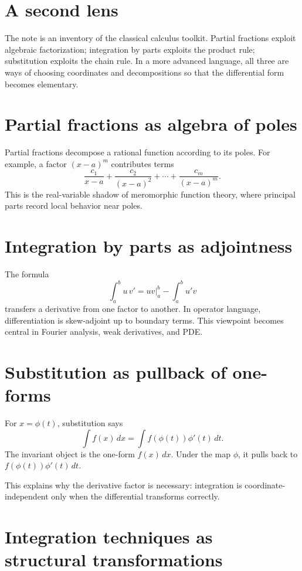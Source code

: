 \section{A second lens}

The note is an inventory of the classical calculus toolkit.  Partial fractions exploit algebraic factorization; integration by parts exploits the product rule; substitution exploits the chain rule.  In a more advanced language, all three are ways of choosing coordinates and decompositions so that the differential form becomes elementary.

\section{Partial fractions as algebra of poles}

Partial fractions decompose a rational function according to its poles.  For example, a factor \((x-a)^m\) contributes terms
\[
  \frac{c_1}{x-a}+\frac{c_2}{(x-a)^2}+\cdots+\frac{c_m}{(x-a)^m}.
\]
This is the real-variable shadow of meromorphic function theory, where principal parts record local behavior near poles.

\section{Integration by parts as adjointness}

The formula
\[
  \int_a^b u\,v'=uv\big|_a^b-\int_a^b u'v
\]
transfers a derivative from one factor to another.  In operator language, differentiation is skew-adjoint up to boundary terms.  This viewpoint becomes central in Fourier analysis, weak derivatives, and PDE.

\section{Substitution as pullback of one-forms}

For \(x=\phi(t)\), substitution says
\[
  \int f(x)\,dx=\int f(\phi(t))\phi'(t)\,dt.
\]
The invariant object is the one-form \(f(x)\,dx\).  Under the map \(\phi\), it pulls back to \(f(\phi(t))\phi'(t)\,dt\).

This explains why the derivative factor is necessary: integration is coordinate-independent only when the differential transforms correctly.

\section{Integration techniques as structural transformations}


